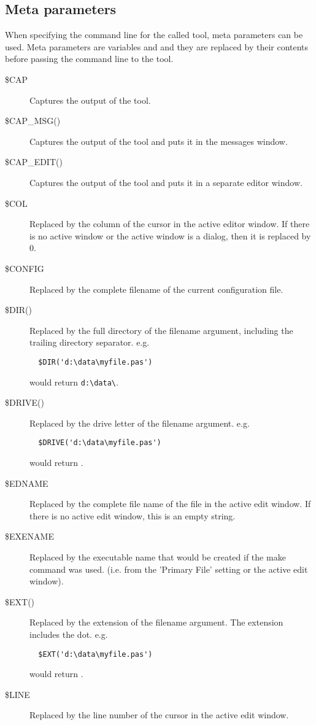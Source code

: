 \subsection{Meta parameters}
When specifying the command line for the called tool, meta parameters can
be used. Meta parameters are variables and and they are replaced
by their contents before passing the command line to the tool.

\begin{description}
\item[\$CAP]
Captures the output of the tool.
\item[\$CAP\_MSG()]
Captures the output of the tool and puts it in the messages window.
\item[\$CAP\_EDIT()]
Captures the output of the tool and puts it in a separate editor window.
\item[\$COL]
Replaced by the column of the cursor in the active editor window. If there is no
 active window or the active window is a dialog, then it is replaced by 0.
\item[\$CONFIG]
Replaced by the complete filename of the current configuration file.
\item[\$DIR()]
Replaced by the full directory of the filename argument, including the trailing
directory separator. e.g.
\begin{verbatim}
  $DIR('d:\data\myfile.pas')
\end{verbatim}
would return \verb|d:\data\|.
\item[\$DRIVE()]
Replaced by the drive letter of the filename argument. e.g.
\begin{verbatim}
  $DRIVE('d:\data\myfile.pas')
\end{verbatim}
would return .
\item[\$EDNAME]
Replaced by the complete file name of the file in the active edit window.
If there is no active edit window, this is an empty string.
\item[\$EXENAME]
Replaced by the executable name that would be created if the make command
was used. (i.e. from the 'Primary File' setting or the active edit window).
\item[\$EXT()]
Replaced by the extension of the filename argument.
The extension includes the dot.
e.g.
\begin{verbatim}
  $EXT('d:\data\myfile.pas')
\end{verbatim}
would return .
\item[\$LINE]
Replaced by the line number of the cursor in the active edit window.

\end{description}
